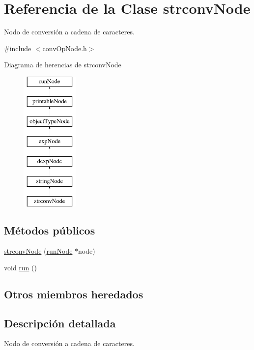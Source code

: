 \hypertarget{classstrconvNode}{\section{Referencia de la Clase strconv\-Node}
\label{classstrconvNode}
}


Nodo de conversión a cadena de caracteres.  




{\ttfamily \#include $<$conv\-Op\-Node.\-h$>$}

Diagrama de herencias de strconv\-Node\begin{figure}[H]
\begin{center}
\leavevmode
\includegraphics[height=7.000000cm]{classstrconvNode}
\end{center}
\end{figure}
\subsection*{Métodos públicos}
\begin{DoxyCompactItemize}
\item 
\hyperlink{classstrconvNode_aca8ef5e64bf7cd8dfbdfb42708bf2315}{strconv\-Node} (\hyperlink{classrunNode}{run\-Node} $\ast$node)
\item 
void \hyperlink{classstrconvNode_a85f8c063a67fe4c753fc9053ec87977b}{run} ()
\end{DoxyCompactItemize}
\subsection*{Otros miembros heredados}


\subsection{Descripción detallada}
Nodo de conversión a cadena de caracteres. 

